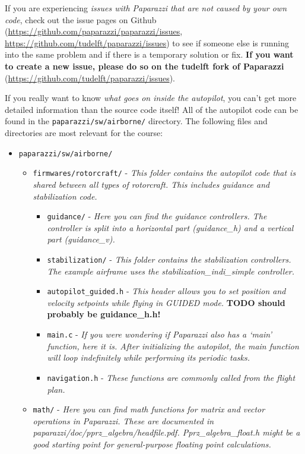 \documentclass{article}
\begin{document}
If you are experiencing \emph{issues with Paparazzi that are not caused by your own code}, check out the issue pages on Github (\url{https://github.com/paparazzi/paparazzi/issues}, \url{https://github.com/tudelft/paparazzi/issues}) to see if someone else is running into the same problem and if there is a temporary solution or fix.
\textbf{If you want to create a new issue, please do so on the tudelft fork of Paparazzi} (\url{https://github.com/tudelft/paparazzi/issues}).

If you really want to know \emph{what goes on inside the autopilot}, you can't get more detailed information than the source code itself! All of the autopilot code can be found in the \texttt{paparazzi/sw/airborne/} directory. The following files and directories are most relevant for the course:
\begin{itemize}
\item \texttt{paparazzi/sw/airborne/}
\begin{itemize}
\item \texttt{firmwares/rotorcraft/} - \emph{This folder contains the autopilot code that is shared between all types of rotorcraft. This includes guidance and stabilization code.}
\begin{itemize}
\item \texttt{guidance/} - \emph{Here you can find the guidance controllers. The controller is split into a horizontal part (guidance\_h) and a vertical part (guidance\_v).}
\item \texttt{stabilization/} - \emph{This folder contains the stabilization controllers. The example airframe uses the stabilization\_indi\_simple controller.}
\item \texttt{autopilot\_guided.h} - \emph{This header allows you to set position and velocity setpoints while flying in GUIDED mode.} \textbf{TODO should probably be guidance\_h.h!}
\item \texttt{main.c} - \emph{If you were wondering if Paparazzi also has a `main' function, here it is. After initializing the autopilot, the main function will loop indefinitely while performing its periodic tasks.}
\item \texttt{navigation.h} - \emph{These functions are commonly called from the flight plan.}
\end{itemize}
\item \texttt{math/} - \emph{Here you can find math functions for matrix and vector operations in Paparazzi. These are documented in paparazzi/doc/pprz\_algebra/headfile.pdf. Pprz\_algebra\_float.h might be a good starting point for general-purpose floating point calculations.}

\end{itemize}
\end{itemize}
\end{document}
